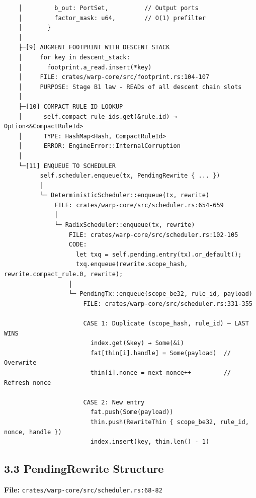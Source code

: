 \documentclass[
]{book}
\begin{document}
\begin{verbatim}
    │         b_out: PortSet,          // Output ports
    │         factor_mask: u64,        // O(1) prefilter
    │       }
    │
    ├─[9] AUGMENT FOOTPRINT WITH DESCENT STACK
    │     for key in descent_stack:
    │       footprint.a_read.insert(*key)
    │     FILE: crates/warp-core/src/footprint.rs:104-107
    │     PURPOSE: Stage B1 law - READs of all descent chain slots
    │
    ├─[10] COMPACT RULE ID LOOKUP
    │      self.compact_rule_ids.get(&rule.id) → Option<&CompactRuleId>
    │      TYPE: HashMap<Hash, CompactRuleId>
    │      ERROR: EngineError::InternalCorruption
    │
    └─[11] ENQUEUE TO SCHEDULER
          self.scheduler.enqueue(tx, PendingRewrite { ... })
          │
          └─ DeterministicScheduler::enqueue(tx, rewrite)
              FILE: crates/warp-core/src/scheduler.rs:654-659
              │
              └─ RadixScheduler::enqueue(tx, rewrite)
                  FILE: crates/warp-core/src/scheduler.rs:102-105
                  CODE:
                    let txq = self.pending.entry(tx).or_default();
                    txq.enqueue(rewrite.scope_hash, rewrite.compact_rule.0, rewrite);
                  │
                  └─ PendingTx::enqueue(scope_be32, rule_id, payload)
                      FILE: crates/warp-core/src/scheduler.rs:331-355

                      CASE 1: Duplicate (scope_hash, rule_id) — LAST WINS
                        index.get(&key) → Some(&i)
                        fat[thin[i].handle] = Some(payload)  // Overwrite
                        thin[i].nonce = next_nonce++         // Refresh nonce

                      CASE 2: New entry
                        fat.push(Some(payload))
                        thin.push(RewriteThin { scope_be32, rule_id, nonce, handle })
                        index.insert(key, thin.len() - 1)
\end{verbatim}

\subsection{3.3 PendingRewrite
Structure}\label{pendingrewrite-structure}

\textbf{File:} \texttt{crates/warp-core/src/scheduler.rs:68-82}
\end{document}

